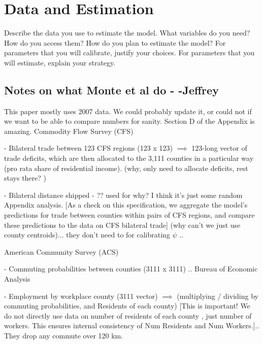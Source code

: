 \documentclass{article}
\begin{document}
\section{Data and Estimation}
\label{sec:data}
Describe the data you use to estimate the model. What
variables do you need? How do you access them? How do you plan to estimate the
model? For parameters that you will calibrate, justify your choices. For parameters
that you will estimate, explain your strategy.

\subsection{Notes on what Monte et al do - -Jeffrey}
This paper mostly uses 2007 data. We could probably update it, or could not if we want to be able to compare numbers for sanity.
Section D of the Appendix is amazing.
Commodity Flow Survey (CFS)

- Bilateral trade between 123 CFS regions (123 x 123) $\implies$ 123-long vector of trade deficits, which are then allocated to the 3,111 counties in a particular way (pro rata share of residential income). (why, only need to allocate deficits, rest stays there? )

- Bilateral distance shipped - ?? used for why? I think it's just some random Appendix analysis. [As a check on this specification, we aggregate the model’s predictions for trade between counties within pairs of CFS regions, and compare these predictions to the data on CFS bilateral trade] (why can't we just use county centroids)... they don't need to for calibrating $\psi$ .. %

American Community Survey (ACS)

- Commuting probabilities between counties (3111 x 3111) .. 
Bureau of Economic Analysis

- Employment by workplace county (3111 vector) $\implies$ (multiplying / dividing by commuting probabilities, and Residents of each county) [This is important! We do not directly use data on number of residents of each county , just number of workers. This ensures internal consistency of Num Residents and Num Workers.].. They drop any commute over 120 km. 
\end{document}
